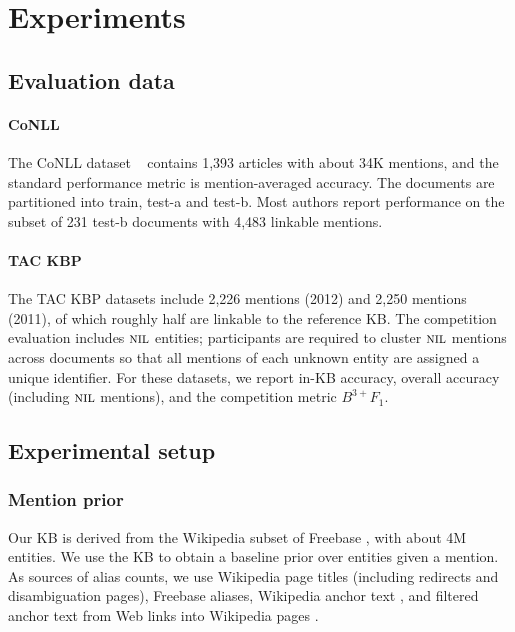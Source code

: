 \section{Experiments}
\label{sec:expt}

\subsection{Evaluation data}

\paragraph{CoNLL} 
The CoNLL dataset ~\cite{Hoffart2011} contains 1,393 articles with
about 34K mentions, and the standard performance metric is
mention-averaged accuracy.  The documents are partitioned into train,
test-a and test-b.  Most authors report performance on the subset of
231 test-b documents with 4,483 linkable mentions.

\paragraph{TAC KBP} 
The TAC KBP datasets \cite{TAC2010,TAC2011,TAC2012} include 2,226 mentions
(2012) and 2,250 mentions (2011), of which roughly half are linkable
to the reference KB.  The competition evaluation includes $\mbox{\textsc{nil}}$
entities; participants are required to cluster $\mbox{\textsc{nil}}$ mentions across
documents so that all mentions of each unknown entity are assigned a
unique identifier.  For these datasets, we report in-KB accuracy,
overall accuracy (including $\mbox{\textsc{nil}}$ mentions), and the competition
metric $B^{3+} F_1$.

\subsection{Experimental setup}

\subsubsection{Mention prior}

Our KB is derived from the Wikipedia subset of Freebase , with about 4M entities. 
We use the KB to obtain a baseline prior over entities given a mention. As sources of alias counts, we use
Wikipedia page titles (including redirects and disambiguation pages), Freebase aliases, 
Wikipedia anchor text ,  and
 filtered anchor text from Web links into Wikipedia pages
\cite{singh12:wiki-links}.

